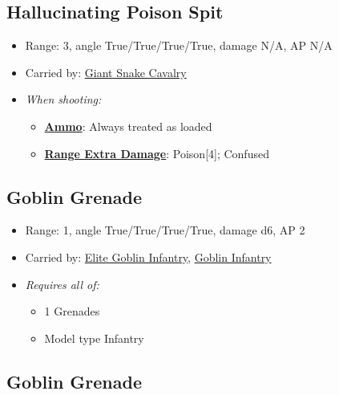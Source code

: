 \documentclass[a4paper,12pt]{article}
\begin{document}
\subsection{Hallucinating Poison Spit}
\label{equipment-hallucinating-poison-spit}

\begin{itemize}
\item Range: 3, angle True/True/True/True, damage N/A, AP N/A
\item Carried by: \hyperref[model-giant-snake-cavalry]{Giant Snake Cavalry}
\item \textit{When shooting:}
\begin{itemize}
\item \textbf{\hyperref[rule-special-ammo]{Ammo}}: Always treated as loaded
\item \textbf{\hyperref[rule-special-range-extra-damage]{Range Extra Damage}}: Poison[4]; Confused

\end{itemize}






\end{itemize}

\subsection{Goblin Grenade}
\label{equipment-goblin-grenade}

\begin{itemize}
\item Range: 1, angle True/True/True/True, damage d6, AP 2
\item Carried by: \hyperref[model-elite-goblin-infantry]{Elite Goblin Infantry}, \hyperref[model-goblin-infantry]{Goblin Infantry}
\item \textit{Requires all of:}
\begin{itemize}
\item 1 Grenades
\item Model type Infantry
\end{itemize}






\end{itemize}

\subsection{Goblin Grenade}
\label{equipment-goblin-grenade-free}
\end{document}
